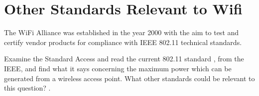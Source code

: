 \section{Other Standards Relevant to Wifi}

The WiFi Alliance was established in the year 2000 with the aim to test
and certify vendor products for compliance with IEEE 802.11 technical
standards.

\begin{exercise}{Examine the Standard}
Access and read the current 802.11 standard \cite{ieee802_11standard}, from the IEEE, and find what it says
concerning the maximum power which can be generated from a wireless access point.
What other standards could be relevant to this question? \cite{alhasmawi2020}.
\end{exercise}
